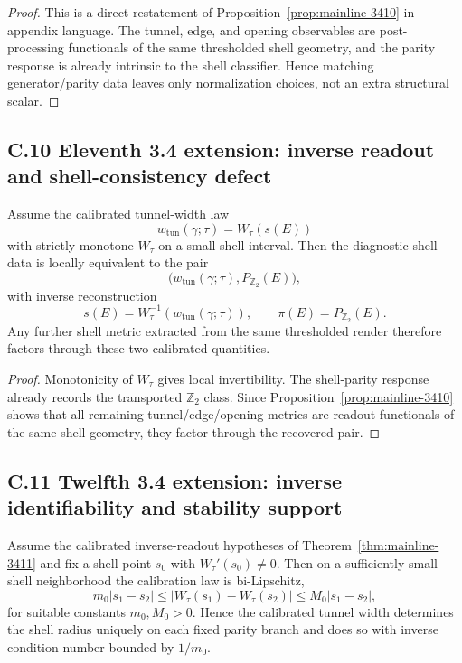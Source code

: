\begin{proof}
This is a direct restatement of Proposition~\ref{prop:mainline-3410} in appendix language. The tunnel, edge, and opening observables are post-processing functionals of the same thresholded shell geometry, and the parity response is already intrinsic to the shell classifier. Hence matching generator/parity data leaves only normalization choices, not an extra structural scalar.
\end{proof}


\subsection*{C.10 Eleventh 3.4 extension: inverse readout and shell-consistency defect}

\begin{theorem}
\label{thm:appendix-3411}
Assume the calibrated tunnel-width law
\[
  w_{\mathrm{tun}}(\gamma;\tau)=W_\tau(s(E))
\]
with strictly monotone $W_\tau$ on a small-shell interval. Then the diagnostic shell data is locally equivalent to the pair
\[
  \bigl(w_{\mathrm{tun}}(\gamma;\tau),P_{\mathbb Z_2}(E)\bigr),
\]
with inverse reconstruction
\[
  s(E)=W_\tau^{-1}(w_{\mathrm{tun}}(\gamma;\tau)),
  \qquad
  \pi(E)=P_{\mathbb Z_2}(E).
\]
Any further shell metric extracted from the same thresholded render therefore factors through these two calibrated quantities.
\end{theorem}

\begin{proof}
Monotonicity of $W_\tau$ gives local invertibility. The shell-parity response already records the transported $\mathbb Z_2$ class. Since Proposition~\ref{prop:mainline-3410} shows that all remaining tunnel/edge/opening metrics are readout-functionals of the same shell geometry, they factor through the recovered pair.
\end{proof}


\subsection*{C.11 Twelfth 3.4 extension: inverse identifiability and stability support}

\begin{theorem}
\label{thm:appendix-3412}
Assume the calibrated inverse-readout hypotheses of Theorem~\ref{thm:mainline-3411} and fix a shell point $s_0$ with $W_\tau'(s_0)\neq 0$. Then on a sufficiently small shell neighborhood the calibration law is bi-Lipschitz,
\[
  m_0|s_1-s_2|
  \le |W_\tau(s_1)-W_\tau(s_2)|
  \le M_0|s_1-s_2|,
\]
for suitable constants $m_0,M_0>0$. Hence the calibrated tunnel width determines the shell radius uniquely on each fixed parity branch and does so with inverse condition number bounded by $1/m_0$.
\end{theorem}

